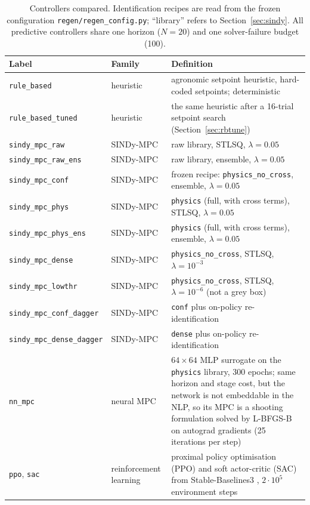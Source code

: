 \begin{table}[htbp]
\centering
\caption{Controllers compared. Identification recipes are read from the frozen
configuration \texttt{regen/regen\_config.py}; ``library'' refers to
Section~\ref{sec:sindy}. All predictive controllers share one horizon ($N=20$) and one
solver-failure budget (100).}
\label{tab:controllers}
\small
\setlength{\tabcolsep}{4pt}
\begin{tabular}{@{}llp{6.4cm}@{}}
\toprule
Label & Family & Definition \\
\midrule
\texttt{rule\_based} & heuristic & agronomic setpoint heuristic, hard-coded setpoints; deterministic \\
\texttt{rule\_based\_tuned} & heuristic & the same heuristic after a 16-trial setpoint search (Section~\ref{sec:rbtune}) \\
\texttt{sindy\_mpc\_raw} & SINDy-MPC & raw library, STLSQ, $\lambda=0.05$ \\
\texttt{sindy\_mpc\_raw\_ens} & SINDy-MPC & raw library, ensemble, $\lambda=0.05$ \\
\texttt{sindy\_mpc\_conf} & SINDy-MPC & frozen recipe: \texttt{physics\_no\_cross}, ensemble, $\lambda=0.05$ \\
\texttt{sindy\_mpc\_phys} & SINDy-MPC & \texttt{physics} (full, with cross terms), STLSQ, $\lambda=0.05$ \\
\texttt{sindy\_mpc\_phys\_ens} & SINDy-MPC & \texttt{physics} (full, with cross terms), ensemble, $\lambda=0.05$ \\
\texttt{sindy\_mpc\_dense} & SINDy-MPC & \texttt{physics\_no\_cross}, STLSQ, $\lambda=10^{-3}$ \\
\texttt{sindy\_mpc\_lowthr} & SINDy-MPC & \texttt{physics\_no\_cross}, STLSQ, $\lambda=10^{-6}$ (not a grey box) \\
\texttt{sindy\_mpc\_conf\_dagger} & SINDy-MPC & \texttt{conf} plus on-policy re-identification \\
\texttt{sindy\_mpc\_dense\_dagger} & SINDy-MPC & \texttt{dense} plus on-policy re-identification \\
\texttt{nn\_mpc} & neural MPC & $64{\times}64$ MLP surrogate on the \texttt{physics} library, 300 epochs; same horizon and stage cost, but the network is not embeddable in the NLP, so its MPC is a shooting formulation solved by L-BFGS-B on autograd gradients (25 iterations per step) \\
\texttt{ppo}, \texttt{sac} & reinforcement learning & proximal policy optimisation (PPO) \cite{schulman2017} and soft actor-critic (SAC) \cite{haarnoja2018} from Stable-Baselines3 \cite{raffin2021}, $2\cdot10^{5}$ environment steps \\

\end{tabular}
\end{table}
